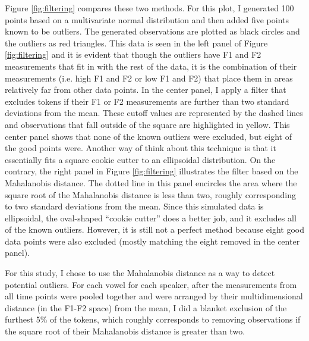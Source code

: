 Figure \ref{fig:filtering} compares these two methods. For this plot, I generated 100 points based on a multivariate normal distribution and then added five points known to be outliers. The generated observations are plotted as black circles and the outliers as red triangles. This data is seen in the left panel of Figure \ref{fig:filtering} and it is evident that though the outliers have F1 and F2 measurements that fit in with the rest of the data, it is the combination of their measurements (i.e. high F1 and F2 or low F1 and F2) that place them in areas relatively far from other data points. In the center panel, I apply a filter that excludes tokens if their F1 or F2 measurements are further than two standard deviations from the mean. These cutoff values are represented by the dashed lines and observations that fall outside of the square are highlighted in yellow. This center panel shows that none of the known outliers were excluded, but eight of the good points were. Another way of think about this technique is that it essentially fits a square cookie cutter to an ellipsoidal distribution. On the contrary, the right panel in Figure \ref{fig:filtering} illustrates the filter based on the Mahalanobis distance. The dotted line in this panel encircles the area where the square root of the Mahalanobis distance is less than two, roughly corresponding to two standard deviations from the mean. Since this simulated data is ellipsoidal, the oval-shaped “cookie cutter” does a better job, and it excludes all of the known outliers. However, it is still not a perfect method because eight good data points were also excluded (mostly matching the eight removed in the center panel).

For this study, I chose to use the Mahalanobis distance as a way to detect potential outliers. For each vowel for each speaker, after the measurements from all time points were pooled together and were arranged by their multidimensional distance (in the F1-F2 space) from the mean, I did a blanket exclusion of the furthest 5\% of the tokens, which roughly corresponds to removing observations if the square root of their Mahalanobis distance is greater than two.

